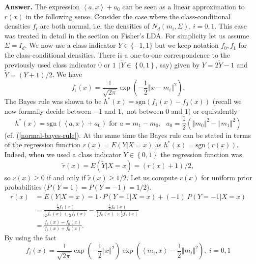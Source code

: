\documentclass[11pt,twoside]{article}%
\theoremstyle{change}
\begin{document}
\textbf{Answer. }The expression $\left\langle a,x\right\rangle +a_{0}$ can be
seen as a linear approximation to $r(x)$ in the following sense. Consider the
case where the class-conditional densities $f_{i}$ are both normal, i.e. the
densities of $N_{d}\left(  m_{i},\Sigma\right)  $, $i=0,1.$ This case was
treated in detail in the section on Fisher's LDA. For simplicity let us assume
$\Sigma=I_{d}$. We now use a class indicator $Y\in\{-1,1\}$ but we keep
notation $f_{0},f_{1}$ for the class-conditional densities. There is a
one-to-one correspondence to the previously used class indicator $0$ or $1$
$(\tilde{Y}\in\left\{  0,1\right\}  $, say) given by $Y=2\tilde{Y}-1$ and
$\tilde{Y}=\left(  Y+1\right)  /2$. We have
\[
f_{i}(x)=\frac{1}{\sqrt{2\pi}}\exp\left(  -\frac{1}{2}\left\Vert
x-m_{i}\right\Vert ^{2}\right)  .
\]
The Bayes rule was shown to be $h^{\ast}(x)=\mathrm{sgn}\left(  f_{1}%
(x)-f_{0}(x)\right)  $ (recall we now formally decide between $-1$ and $1,$
not between $0$ and $1$) or equivalently
\begin{equation}
h^{\ast}(x)=\mathrm{sgn}\left(  \left\langle a,x\right\rangle +a_{0}\right)
\text{ for }a=m_{1}-m_{0},\text{ }a_{0}=\frac{1}{2}\left(  \left\Vert
m_{0}\right\Vert ^{2}-\left\Vert m_{1}\right\Vert ^{2}\right)
\label{normal-bayes-rule-b}%
\end{equation}
(cf. (\ref{normal-bayes-rule}). At the same time the Bayes rule can be stated
in terms of the regression function $r(x)=E\left(  Y|X=x\right)  $ as
$h^{\ast}(x)=\mathrm{sgn}\left(  r(x)\right)  $. Indeed, when we used a class
indicator $\tilde{Y}\in\left\{  0,1\right\}  $ the regression function was
\[
\tilde{r}(x)=E\left(  \tilde{Y}|X=x\right)  =\left(  r(x)+1\right)  /2,
\]
so $r(x)\geq0$ if and only if $\tilde{r}(x)\geq1/2$. Let us compute $r(x)$ for
uniform prior probabilities ($P(Y=1)=P(Y=-1)=1/2$).
\begin{align*}
r(x)  & =E\left(  Y|X=x\right)  =1\cdot P\left(  Y=1|X=x\right)  +\left(
-1\right)  \mathit{\ }P\left(  Y=-1|X=x\right) \\
& =\frac{\frac{1}{2}f_{1}(x)}{\frac{1}{2}f_{0}(x)+\frac{1}{2}f_{1}(x)}%
-\frac{\frac{1}{2}f_{0}(x)}{\frac{1}{2}f_{0}(x)+\frac{1}{2}f_{1}(x)}\\
& =\frac{f_{1}(x)-f_{0}(x)}{f_{1}(x)+f_{0}(x)}.
\end{align*}
By using the fact
\[
f_{i}(x)=\frac{1}{\sqrt{2\pi}}\exp\left(  -\frac{1}{2}\left\Vert x\right\Vert
^{2}\right)  \exp\left(  \left\langle m_{i},x\right\rangle -\frac{1}%
{2}\left\Vert m_{i}\right\Vert ^{2}\right)  ,\;i=0,1
\]
\end{document}
